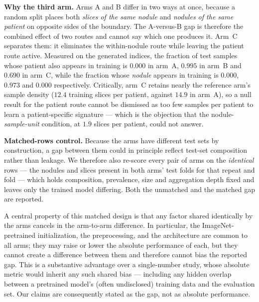 \documentclass{ieeeaccess}
\begin{document}
\textbf{Why the third arm.} Arms A and B differ in two ways at once, because a random split places
both \emph{slices of the same nodule} and \emph{nodules of the same patient} on opposite sides of the
boundary. The A-versus-B gap is therefore the combined effect of two routes and cannot say which one
produces it. Arm~C separates them: it eliminates the within-nodule route while leaving the
patient route active. Measured on the generated indices, the fraction of test samples whose patient
also appears in training is $0.000$ in arm~A, $0.995$ in arm~B and $0.690$ in arm~C, while the
fraction whose \emph{nodule} appears in training is $0.000$, $0.973$ and $0.000$ respectively.
Critically, arm~C retains nearly the reference arm's sample density ($12.4$ training slices per patient, against $14.9$ in
arm~A), so a null result for the patient route cannot be dismissed as too few samples per patient to
learn a patient-specific signature --- which is the objection that the nodule-\emph{sample-unit}
condition, at $1.9$ slices per patient, could not answer.

\textbf{Matched-rows control.} Because the arms have different test sets by construction, a gap
between them could in principle reflect test-set composition rather than leakage. We therefore also
re-score every pair of arms on the \emph{identical} rows --- the nodules and slices present in both
arms' test folds for that repeat and fold --- which holds composition, prevalence, size and
aggregation depth fixed and leaves only the trained model differing. Both the unmatched and the
matched gap are reported.

A central property of this matched design is that any factor shared identically by the arms
cancels in the arm-to-arm difference. In particular, the ImageNet-pretrained initialization, the
preprocessing, and the architecture are common to all arms; they may raise or lower the absolute
performance of each, but they cannot create a difference between them and therefore cannot bias the
reported gap. This is a substantive advantage over a single-number study, whose absolute metric
would inherit any such shared bias --- including any hidden overlap between a pretrained model's
(often undisclosed) training data and the evaluation set. Our claims are consequently stated as the
gap, not as absolute performance.
\end{document}
